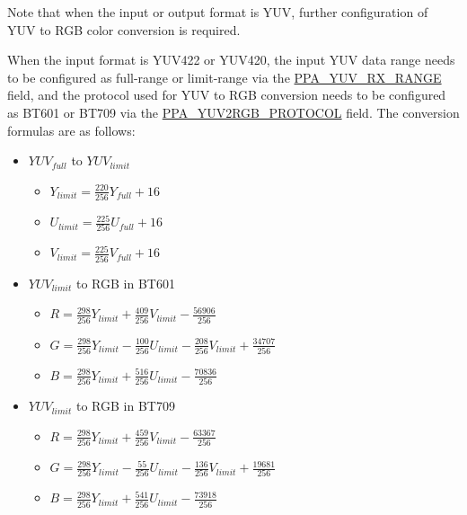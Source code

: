 \documentclass[main\_\_EN.tex]{subfiles}
\begin{document}
\begin{longtable}[c]{ |p{4cm}|p{4.2cm}|p{8.3cm}| }
\end{longtable}

Note that when the input or output format is YUV, further configuration of YUV to RGB color conversion is required.

When the input format is YUV422 or YUV420, the input YUV data range needs to be configured as full-range or limit-range via the \hyperref[fielddesc:PPAYUVRXRANGE]{PPA\_YUV\_RX\_RANGE} field, and the protocol used for YUV to RGB conversion needs to be configured as BT601 or BT709 via the \hyperref[fielddesc:PPAYUV2RGBPROTOCOL]{PPA\_YUV2RGB\_PROTOCOL} field. The conversion formulas are as follows:

\begin{itemize}
    \item $YUV_{full}$ to $YUV_{limit}$
        \begin{itemize}
            \item $Y_{limit} = \frac{220}{256} Y_{full} + 16$
            \item $U_{limit} = \frac{225}{256} U_{full} + 16$
            \item $V_{limit} = \frac{225}{256} V_{full} + 16$
        \end{itemize}
    \item $YUV_{limit}$ to RGB in BT601
        \begin{itemize}
            \item $R = \frac{298}{256}Y_{limit} + \frac{409}{256}V_{limit} - \frac{56906}{256}$
            \item $G = \frac{298}{256}Y_{limit} - \frac{100}{256}U_{limit} - \frac{208}{256}V_{limit} + \frac{34707}{256}$
            \item $B = \frac{298}{256}Y_{limit} + \frac{516}{256}U_{limit} -  \frac{70836}{256}$
        \end{itemize}
    \item $YUV_{limit}$ to RGB in BT709
        \begin{itemize}
            \item $R = \frac{298}{256}Y_{limit} + \frac{459}{256}V_{limit} - \frac{63367}{256}$
            \item $G = \frac{298}{256}Y_{limit} - \frac{55}{256}U_{limit} - \frac{136}{256}V_{limit} + \frac{19681}{256}$
            \item $B = \frac{298}{256}Y_{limit} + \frac{541}{256}U_{limit} -  \frac{73918}{256}$
        \end{itemize}
\end{itemize}
\end{document}
